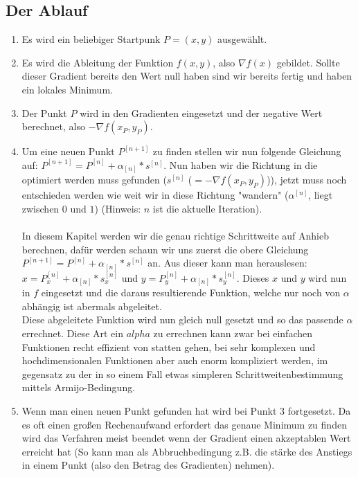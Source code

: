 \documentclass[a4paper, 11pt]{article}
\begin{document}
\subsection{Der Ablauf}
\begin{enumerate}

      \item 
      Es wird ein beliebiger Startpunk $P=(x,y)$ ausgewählt.
      \item 
      Es wird die Ableitung der Funktion $f(x,y)$, also ${\nabla}f(x)$ gebildet. Sollte dieser Gradient bereits den Wert null haben sind wir bereits fertig und haben ein lokales Minimum.
      \item 
      Der Punkt $P$ wird in den Gradienten eingesetzt und der negative Wert berechnet, also $-{\nabla}f(x_{P},y_{P})$.
      \item
      Um eine neuen Punkt $P^{[n+1]}$ zu finden stellen wir nun folgende Gleichung auf: $P^{[n+1]} = P^{[n]} + \alpha_{[n]} * s^{[n]}$. Nun haben wir die Richtung in die optimiert werden muss gefunden ($s^{[n]}$ ($=-{\nabla}f(x_{P},y_{P})$)), jetzt muss noch entschieden werden wie weit wir in diese Richtung "wandern" ($\alpha^{[n]}$, liegt zwischen $0$ und $1$) (Hinweis: $n$ ist die aktuelle Iteration). \\\\
      In diesem Kapitel werden wir die genau richtige Schrittweite auf Anhieb berechnen, dafür werden schaun wir uns zuerst die obere Gleichung $P^{[n+1]} = P^{[n]} + \alpha_{[n]} * s^{[n]}$ an. Aus dieser kann man herauslesen: $x=P^{[n]}_{x} + \alpha_{[n]} * s^{[n]}_{x}$ und $y=P^{[n]}_{y} + \alpha_{[n]} * s^{[n]}_{y}$. Dieses $x$ und $y$ wird nun in $f$ eingesetzt und die daraus resultierende Funktion, welche nur noch von $\alpha$ abhängig ist abermals abgeleitet. \\
      Diese abgeleitete Funktion wird nun gleich null gesetzt und so das passende $\alpha$ errechnet. Diese Art ein $alpha$ zu errechnen kann zwar bei einfachen Funktionen recht effizient von statten gehen, bei sehr komplexen und hochdimensionalen Funktionen aber auch enorm kompliziert werden, im gegensatz zu der in so einem Fall etwas simpleren Schrittweitenbestimmung mittels Armijo-Bedingung.      
      \item
      Wenn man einen neuen Punkt gefunden hat wird bei Punkt 3 fortgesetzt. Da es oft einen großen Rechenaufwand erfordert das genaue Minimum zu finden wird das Verfahren meist beendet wenn der Gradient einen akzeptablen Wert erreicht hat (So kann man als Abbruchbedingung z.B. die stärke des Anstiegs in einem Punkt (also den Betrag des Gradienten) nehmen).
      
      \end{enumerate}
      
\end{document}
